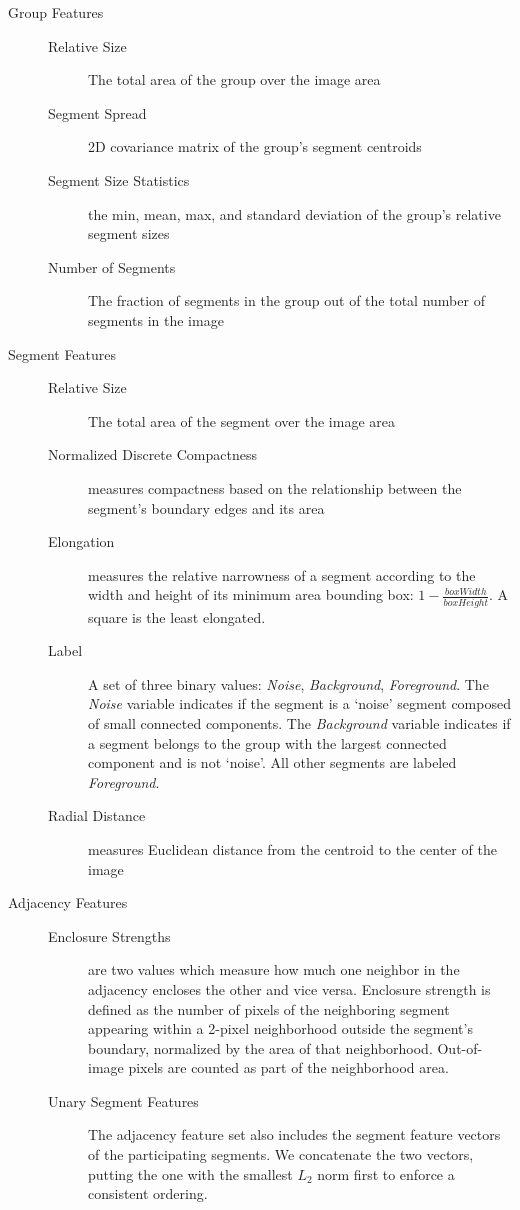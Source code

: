 \begin{description}

\item[Group Features] \hfill
	\begin{description}
	  \item[Relative Size] The total area of the group over the image area
	  \item[Segment Spread] 2D covariance matrix of the group's segment centroids
	  \item[Segment Size Statistics] the min, mean, max, and standard deviation of the group's relative segment sizes
	  \item[Number of Segments] The fraction of segments in the group out of the total number of segments in the image
	\end{description}
	
\item[Segment Features] \hfill
	\begin{description}
	  \item[Relative Size] The total area of the segment over the image area
	  \item[Normalized Discrete Compactness] measures compactness based on the relationship between the segment's boundary edges and its area ~\cite{NormalizedDiscreteCompactness}
	  \item[Elongation] measures the relative narrowness of a segment according to the width and height of its minimum area bounding box: $1-\frac{boxWidth}{boxHeight}$. A square is the least elongated.
	  \item[Label] A set of three binary values: {\emph{Noise}, \emph{Background}, \emph{Foreground}}. The \emph{Noise} variable indicates if the segment is a `noise' segment composed of small connected components. The \emph{Background} variable indicates if a segment belongs to the group with the largest connected component and is not `noise'. All other segments are labeled \emph{Foreground}.
	  \item[Radial Distance] measures Euclidean distance from the centroid to the center of the image
	\end{description}

\item[Adjacency Features] \hfill
	\begin{description}
	  \item[Enclosure Strengths] are two values which measure how much one neighbor in the adjacency encloses the other and vice versa. Enclosure strength is defined as the number of pixels of the neighboring segment appearing within a 2-pixel neighborhood outside the segment's boundary, normalized by the area of that neighborhood. Out-of-image pixels are counted as part of the neighborhood area.
	  \item[Unary Segment Features] The adjacency feature set also includes the segment feature vectors of the participating segments. We concatenate the two vectors, putting the one with the smallest $L_2$ norm first to enforce a consistent ordering.
	\end{description}
	
\end{description}
